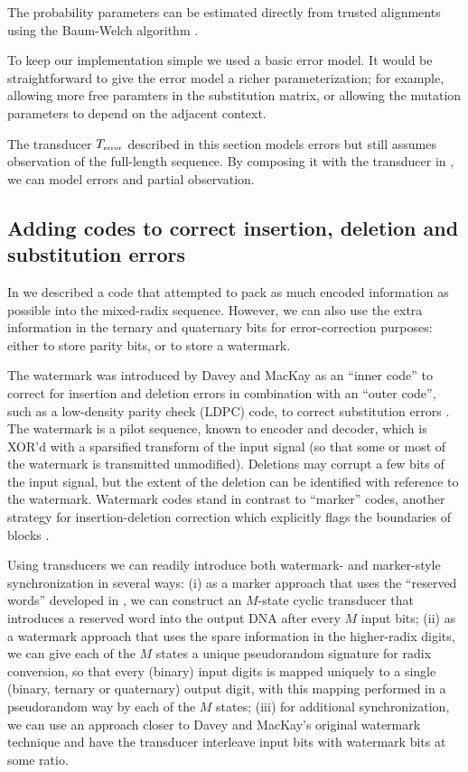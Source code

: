 \documentclass[english]{article}
\begin{document}
The probability parameters can be estimated directly from trusted alignments using the Baum-Welch algorithm \cite{Durbin98}.

To keep our implementation simple we used a basic error model.
It would be straightforward to give the error model a richer parameterization;
for example, allowing more free paramters in the substitution matrix,
or allowing the mutation parameters to depend on the adjacent context.

The transducer $T_{\mbox{\tiny error}}$
described in this section models errors but still assumes observation of the full-length sequence.
By composing it with the transducer in , we can model errors and partial observation.

\subsection{Adding codes to correct insertion, deletion and substitution errors}

In  we described a code that attempted to pack as much encoded information as possible into the mixed-radix sequence.
However, we can also use the extra information in the ternary and quaternary bits for error-correction purposes:
either to store parity bits, or to store a watermark.

The watermark was introduced by Davey and MacKay as an ``inner code'' to correct for insertion and deletion errors
in combination with an ``outer code'', such as a low-density parity check (LDPC) code, to correct substitution errors \cite{DaveyMackay2000,DaveyMackay2001}.
The watermark is a pilot sequence, known to encoder and decoder, which is XOR'd with a sparsified transform of the input signal
(so that some or most of the watermark is transmitted unmodified).
Deletions may corrupt a few bits of the input signal, but the extent of the deletion can be identified with reference to the watermark.
Watermark codes stand in contrast to ``marker'' codes, another strategy for insertion-deletion correction which explicitly flags the boundaries of blocks \cite{RatzerMackay2000}.

Using transducers we can readily introduce both watermark- and marker-style synchronization in several ways:
(i) as a marker approach that uses the ``reserved words'' developed in ,
we can construct an $M$-state cyclic transducer that introduces a reserved word into the output DNA after every $M$ input bits;
(ii) as a watermark approach that uses the spare information in the higher-radix digits, we can give each of the $M$ states a unique pseudorandom signature for radix conversion,
so that every (binary) input digits is mapped uniquely to a single (binary, ternary or quaternary) output digit,
with this mapping performed in a pseudorandom way by each of the $M$ states;
(iii) for additional synchronization, we can use an approach closer to Davey and MacKay's original watermark technique
and have the transducer interleave input bits with watermark bits at some ratio.
\end{document}
